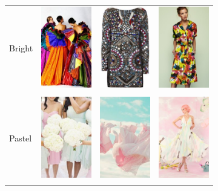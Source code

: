 \newcommand{\dgap}{.42in}
\begin{figure}
\begin{subfigure}[t]{0.48\linewidth}
    \begin{tabular}{m{.02in}|m{\dgap} m{\dgap} m{\dgap}}
    \begin{turn}{90}\small{Bright}\end{turn} &
    \includegraphics[width=.53in]{../style/figures/flickr_on_pinterest/dress/pred_style_Bright/h/0.jpg} &
    \includegraphics[width=.53in]{../style/figures/flickr_on_pinterest/dress/pred_style_Bright/h/1.jpg} &
    \includegraphics[width=.53in]{../style/figures/flickr_on_pinterest/dress/pred_style_Bright/h/2.jpg} \\ \\
    \begin{turn}{90}\small{Pastel}\end{turn} &
    \includegraphics[width=.53in]{../style/figures/flickr_on_pinterest/dress/pred_style_Pastel/h/0.jpg} &
    \includegraphics[width=.53in]{../style/figures/flickr_on_pinterest/dress/pred_style_Pastel/h/1.jpg} &
    \includegraphics[width=.53in]{../style/figures/flickr_on_pinterest/dress/pred_style_Pastel/h/2.jpg} \\ \\

\end{tabular}
\end{subfigure}
\end{figure}
